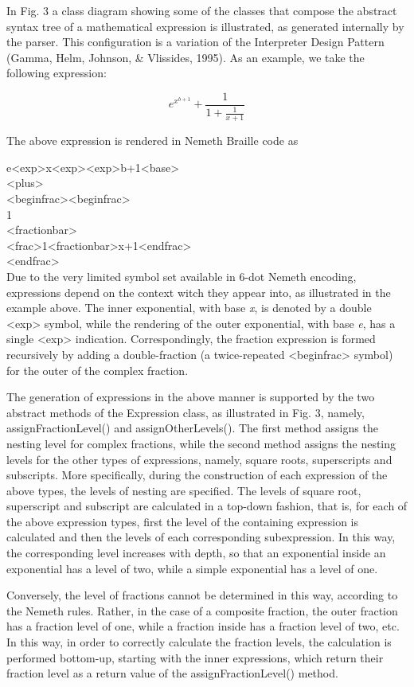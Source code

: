 \documentclass[11.5pt]{sig-alternate} %
\begin{document}
\begin{large}
In Fig. 3 a class diagram showing some of the classes that compose the abstract syntax tree of a mathematical expression is illustrated, as generated internally by the parser. This configuration is a variation of the Interpreter Design Pattern (Gamma, Helm, Johnson, \& Vlissides, 1995). As an example, we take the following expression:

\[e^{{x}^{b+1}} + \frac{1}{1+\frac{1}{x+1}}\]

The above expression is rendered in Nemeth Braille code as 

e<exp>x<exp><exp>b+1<base> \\
<plus> \\
<beginfrac><beginfrac>\\
1\\
<fractionbar>\\
<frac>1<fractionbar>x+1<endfrac>\\
<endfrac>\\

Due to the very limited symbol set available in 6-dot Nemeth encoding, expressions depend on the context witch they appear into, as illustrated in the example above. The inner exponential, with base \textit{x}, is denoted by a double <exp> symbol, while the rendering of the outer exponential, with base \textit{e}, has a single <exp> indication. Correspondingly, the fraction expression is formed recursively by adding a double-fraction (a twice-repeated <beginfrac> symbol) for the outer of the complex fraction.

The generation of expressions in the above manner is supported by the two abstract methods of the Expression class, as illustrated in Fig. 3, namely, assignFractionLevel() and assignOtherLevels(). The first method assigns the nesting level for complex fractions, while the second method assigns the nesting levels for the other types of expressions, namely, square roots, superscripts and subscripts. More specifically, during the construction of each expression of the above types, the levels of nesting are specified. The levels of square root, superscript and subscript are calculated in a top-down fashion, that is, for each of the above expression types, first the level of the containing expression is calculated and then the levels of each corresponding subexpression. In this way, the corresponding level increases with depth, so that an exponential inside an exponential has a level of two, while a simple exponential has a level of one.

Conversely, the level of fractions cannot be determined in this way, according to the Nemeth rules. Rather, in the case of a composite fraction, the outer fraction has a fraction level of one, while a fraction inside has a fraction level of two, etc. In this way, in order to correctly calculate the fraction levels, the calculation is performed bottom-up, starting with the inner expressions, which return their fraction level as a return value of the assignFractionLevel() method.



\end{large}
\end{document}
